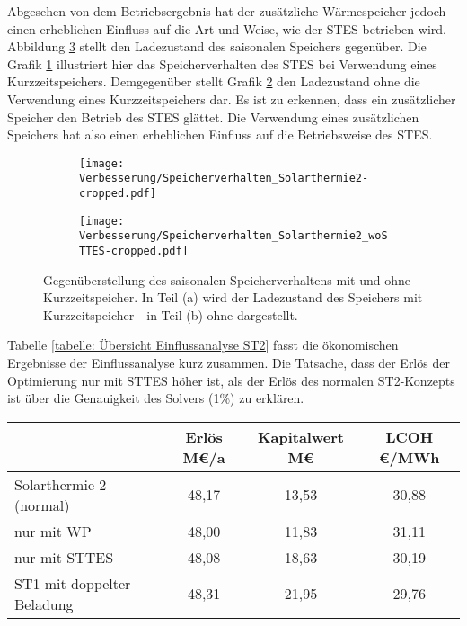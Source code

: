 Abgesehen von dem Betriebsergebnis hat der zusätzliche Wärmespeicher jedoch einen erheblichen Einfluss auf die Art und Weise, wie der \ac{STES} betrieben wird. Abbildung \ref{fig: Einfluss_Speicher_Solar_2} stellt den Ladezustand des saisonalen Speichers gegenüber. Die Grafik \ref{fig: Speicherkapazität_ST2} illustriert hier das Speicherverhalten des \ac{STES} bei Verwendung eines Kurzzeitspeichers. Demgegenüber stellt Grafik \ref{fig: Speicherkapazität_Einfluss_ST2} den Ladezustand ohne die Verwendung eines Kurzzeitspeichers dar. Es ist zu erkennen, dass ein zusätzlicher Speicher den Betrieb des \ac{STES} glättet. Die Verwendung eines zusätzlichen Speichers hat also einen erheblichen Einfluss auf die Betriebsweise des \ac{STES}.
	\begin{figure}[ht]
		\begin{subfigure}[b]{0.48\textwidth}
			\texttt{[image: Verbesserung/Speicherverhalten\_Solarthermie2-cropped.pdf]}
			\label{fig: Speicherkapazität_ST2}
		\end{subfigure}
		\hfill
		\begin{subfigure}[b]{0.48\textwidth}
			\texttt{[image: Verbesserung/Speicherverhalten\_Solarthermie2\_woSTTES-cropped.pdf]}
			\label{fig: Speicherkapazität_Einfluss_ST2}
		\end{subfigure}
		\caption[Vergleich des saisonalen Speicherverhaltens mit und ohne Kurzzeitspeicher]{Gegenüberstellung des saisonalen Speicherverhaltens mit und ohne Kurzzeitspeicher. In Teil (a) wird der Ladezustand des Speichers mit Kurzzeitspeicher - in Teil (b) ohne dargestellt.}
		\label{fig: Einfluss_Speicher_Solar_2}
	\end{figure}

Tabelle \ref{tabelle: Übersicht Einflussanalyse ST2} fasst die ökonomischen Ergebnisse der Einflussanalyse kurz zusammen. Die Tatsache, dass der Erlös der Optimierung nur mit \acl{STTES} höher ist, als der Erlös des normalen ST2-Konzepts ist über die Genauigkeit des Solvers (1\%) zu erklären.
\newpage
	\begin{center}
		\label{tabelle: Übersicht Einflussanalyse ST2}
		\begin{tabular}{lcccc}
			\hline 
			&  & Erlös M\euro/a & Kapitalwert M\euro & \ac{LCOH} \euro/MWh\tabularnewline
			
			\hline 
			Solarthermie 2 (normal)  &  & 48,17 & 13,53 & 30,88 \tabularnewline
			nur mit \ac{WP}			 &  & 48,00 & 11,83 & 31,11\tabularnewline
			nur mit \ac{STTES} 		 &  & 48,08 & 18,63 & 30,19\tabularnewline
			ST1 mit doppelter Beladung 		 & & 48,31 & 21,95 & 29,76\tabularnewline		
			\hline
		\end{tabular}
	\end{center}

